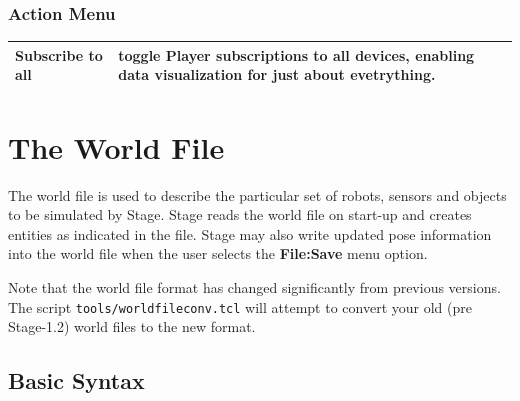 \documentclass[11pt,twoside]{report}
\begin{document}
\subsection{Action Menu}

\begin{tabular}{|l|l|}
\hline 
Subscribe to all & toggle Player subscriptions to all devices,
enabling data visualization for just about evetrything. \\
\hline
\end{tabular}


\chapter{The World File}
\label{sec:world}

The world file is used to describe the particular set of robots,
sensors and objects to be simulated by Stage.  Stage reads the world
file on start-up and creates entities as indicated in the file.  Stage
may also write updated pose information into the world file when the
user selects the {\bf File:Save} menu option.

Note that the world file format has changed significantly from
previous versions. The script \verb+tools/worldfileconv.tcl+ will
attempt to convert your old (pre Stage-1.2) world files to the new
format.

\section{Basic Syntax}
\end{document}
